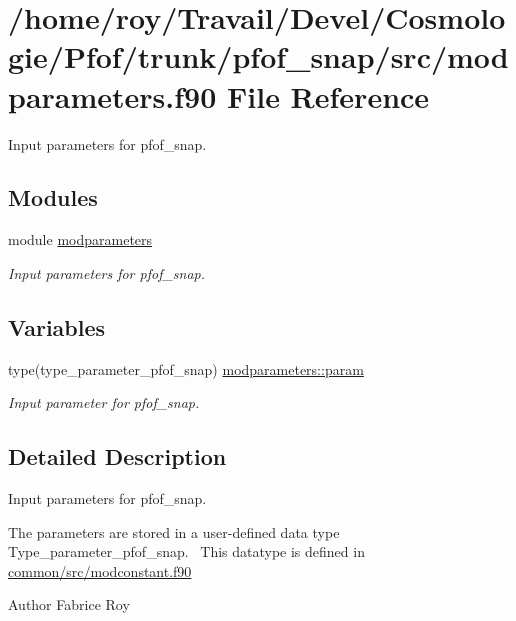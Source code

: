 \hypertarget{pfof__snap_2src_2modparameters_8f90}{}\section{/home/roy/\+Travail/\+Devel/\+Cosmologie/\+Pfof/trunk/pfof\+\_\+snap/src/modparameters.f90 File Reference}
\label{pfof__snap_2src_2modparameters_8f90}


Input parameters for pfof\+\_\+snap.  


\subsection*{Modules}
\begin{DoxyCompactItemize}
\item 
module \hyperlink{namespacemodparameters}{modparameters}
\begin{DoxyCompactList}\small\item\em Input parameters for pfof\+\_\+snap. ~\newline
 \end{DoxyCompactList}\end{DoxyCompactItemize}
\subsection*{Variables}
\begin{DoxyCompactItemize}
\item 
type(type\+\_\+parameter\+\_\+pfof\+\_\+snap) \hyperlink{namespacemodparameters_abc02ba22055134e4f7e714d0cc521f61}{modparameters\+::param}
\begin{DoxyCompactList}\small\item\em Input parameter for pfof\+\_\+snap. \end{DoxyCompactList}\end{DoxyCompactItemize}


\subsection{Detailed Description}
Input parameters for pfof\+\_\+snap. 

The parameters are stored in a user-\/defined data type Type\+\_\+parameter\+\_\+pfof\+\_\+snap.~\newline
 This datatype is defined in \hyperlink{modconstant_8f90}{common/src/modconstant.\+f90} \begin{DoxyAuthor}{Author}
Fabrice Roy 
\end{DoxyAuthor}

